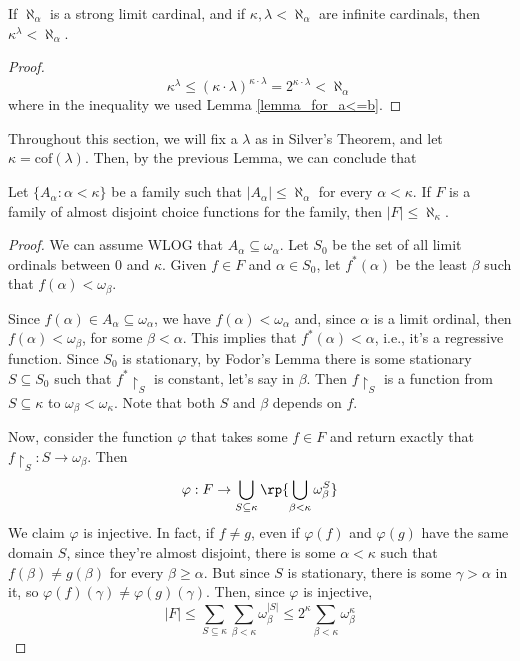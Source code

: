\begin{lemma}{}{}
    If $\aleph_\alpha$ is a strong limit cardinal, and if $\kappa,\lambda<\aleph_\alpha$ are infinite cardinals, then $\kappa^\lambda<\aleph_\alpha$.
\end{lemma}

\begin{proof}
    $$\kappa^\lambda\leq(\kappa\cdot\lambda)^{\kappa\cdot\lambda}=2^{\kappa\cdot\lambda}<\aleph_\alpha$$
    where in the inequality we used Lemma \ref{lemma_for_a<=b}.
\end{proof}

Throughout this section, we will fix a $\lambda$ as in Silver's Theorem, and let $\kappa=\text{cof}(\lambda)$. Then, by the previous Lemma, we can conclude that 


\begin{lemma}{}{}
    Let $\{A_\alpha:\alpha<\kappa\}$ be a family such that $\lvert A_\alpha\rvert\leq\aleph_\alpha$ for every $\alpha<\kappa$. If $F$ is a family of almost disjoint choice functions for the family, then $\lvert F\rvert\leq\aleph_\kappa$.
\end{lemma}

\begin{proof}
    We can assume WLOG that $A_\alpha\subseteq\omega_\alpha$. Let $S_0$ be the set of all limit ordinals between $0$ and $\kappa$. Given $f\in F$ and $\alpha\in S_0$, let $f^*(\alpha)$ be the least $\beta$ such that $f(\alpha)<\omega_\beta$.

    Since $f(\alpha)\in A_\alpha\subseteq\omega_\alpha$, we have $f(\alpha)<\omega_\alpha$ and, since $\alpha$ is a limit ordinal, then $f(\alpha)<\omega_\beta$, for some $\beta<\alpha$. This implies that $f^*(\alpha)<\alpha$, i.e., it's a regressive function. Since $S_0$ is stationary, by Fodor's Lemma there is some stationary $S\subseteq S_0$ such that $f^*\restriction_S$ is constant, let's say in $\beta$. Then $f\restriction_S$ is a function from $S\subseteq\kappa$ to $\omega_\beta<\omega_\kappa$. Note that both $S$ and $\beta$ depends on $f$.

    Now, consider the function $\varphi$ that takes some $f\in F$ and return exactly that $f\restriction_S:S\to\omega_\beta$. Then
    $$\varphi:F\to\bigcup_{S\subseteq\kappa}\rp{\bigcup_{\beta<\kappa}\omega_\beta^S}$$
    We claim $\varphi$ is injective. In fact, if $f\neq g$, even if $\varphi(f)$ and $\varphi(g)$ have the same domain $S$, since they're almost disjoint, there is some $\alpha<\kappa$ such that $f(\beta)\neq g(\beta)$ for every $\beta\geq\alpha$. But since $S$ is stationary, there is some $\gamma>\alpha$ in it, so $\varphi(f)(\gamma)\neq\varphi(g)(\gamma)$. Then, since $\varphi$ is injective,
    $$\lvert F\rvert\leq\sum_{S\subseteq\kappa}\sum_{\beta<\kappa}\omega_\beta^{\lvert S\rvert}\leq 2^\kappa\sum_{\beta<\kappa}\omega_\beta^\kappa$$
\end{proof}
